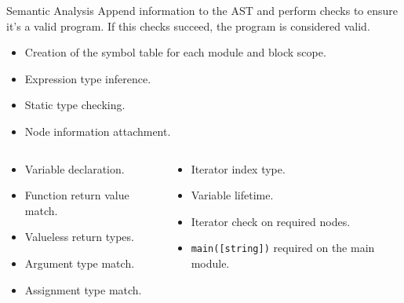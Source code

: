 \begin{slide}
    \begin{block}{Semantic Analysis}
        Append information to the AST and perform checks to ensure it's a valid program.
        If this checks succeed, the program is considered valid.
    \end{block}
    \vfill
    \begin{itemize}
        \item Creation of the symbol table for each module and block scope.
        \item Expression type inference.
        \item Static type checking.
        \item Node information attachment.
    \end{itemize}
\end{slide}
\begin{slide}
    \vspace{0.5em}
    \begin{columns}
        \begin{column}{0.5\textwidth}
            \begin{itemize}
                \item Variable declaration.
                \item Function return value match.
                \item Valueless return types.
                \item Argument type match.
                \item Assignment type match.
            \end{itemize}
        \end{column}
        \begin{column}{0.5\textwidth}
            \begin{itemize}
                \item Iterator index type.
                \item Variable lifetime.
                \item Iterator check on required nodes.
                \item \texttt{main([string])} required on the main module.
            \end{itemize}
        \end{column}
    \end{columns}
\end{slide}
